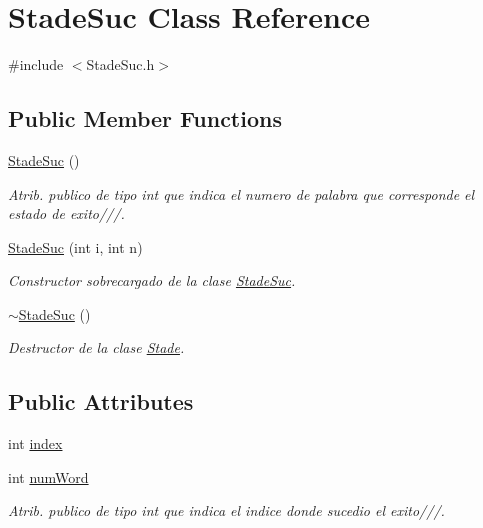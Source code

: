 \hypertarget{class_stade_suc}{\section{Stade\+Suc Class Reference}
\label{class_stade_suc}
}


{\ttfamily \#include $<$Stade\+Suc.\+h$>$}

\subsection*{Public Member Functions}
\begin{DoxyCompactItemize}
\item 
\hyperlink{class_stade_suc_ae069c77a99d27cf9f3bd37253b19c146}{Stade\+Suc} ()
\begin{DoxyCompactList}\small\item\em Atrib. publico de tipo int que indica el numero de palabra que corresponde el estado de exito///. \end{DoxyCompactList}\item 
\hyperlink{class_stade_suc_aee378a96e88aceea354d7a946d1d535e}{Stade\+Suc} (int i, int n)
\begin{DoxyCompactList}\small\item\em Constructor sobrecargado de la clase \hyperlink{class_stade_suc}{Stade\+Suc}. \end{DoxyCompactList}\item 
\hyperlink{class_stade_suc_acf19e9a05be93424f68acff2deafad4a}{$\sim$\+Stade\+Suc} ()
\begin{DoxyCompactList}\small\item\em Destructor de la clase \hyperlink{class_stade}{Stade}. \end{DoxyCompactList}\end{DoxyCompactItemize}
\subsection*{Public Attributes}
\begin{DoxyCompactItemize}
\item 
int \hyperlink{class_stade_suc_a32866d1f7785fc1a3208a161346ba85f}{index}
\item 
int \hyperlink{class_stade_suc_a9fd058e20b7c620287c5fde47f2d2839}{num\+Word}
\begin{DoxyCompactList}\small\item\em Atrib. publico de tipo int que indica el indice donde sucedio el exito///. \end{DoxyCompactList}\end{DoxyCompactItemize}


